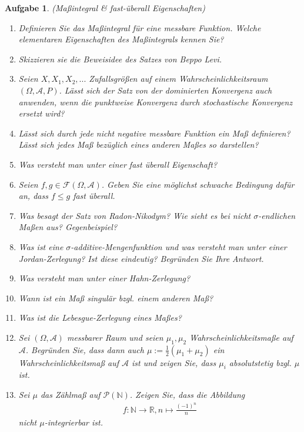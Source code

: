 \documentclass[11pt, a4paper, ngerman]{article}
\newcommand{\N}{\mathbb{N}}
\newcommand{\R}{\mathbb{R}}
\newtheorem{aufgabe}{Aufgabe}
\begin{document}
\begin{aufgabe} (Maßintegral \& fast-überall Eigenschaften)
    \begin{enumerate}
        \item 
        Definieren Sie das Maßintegral für eine messbare Funktion. Welche elementaren Eigenschaften des Maßintegrals kennen Sie?  
        \item
        Skizzieren sie die Beweisidee des Satzes von Beppo Levi. 
        \item 
        Seien $X, X_1, X_2,...$ Zufallsgrößen auf einem Wahrscheinlichkeitsraum $(\Omega, \mathcal{A},P)$. Lässt sich der Satz von der dominierten Konvergenz auch anwenden, wenn die punktweise Konvergenz durch stochastische Konvergenz ersetzt wird? 
        \item 
        Lässt sich durch jede nicht negative messbare Funktion ein Maß definieren? Lässt sich jedes Maß bezüglich eines anderen Maßes so darstellen?
        \item 
        Was versteht man unter einer fast überall Eigenschaft?
        \item 
        Seien $f,g \in \mathcal{F}(\Omega, \mathcal{A})$. Geben Sie eine möglichst schwache Bedingung dafür an, dass $f \leq g$ fast überall.
        \item 
        Was besagt der Satz von Radon-Nikodym? Wie sieht es bei nicht $\sigma$-endlichen Maßen aus? Gegenbeispiel?
        \item 
        Was ist eine $\sigma$-additive-Mengenfunktion und was versteht man unter einer Jordan-Zerlegung? Ist diese eindeutig? Begründen Sie Ihre Antwort. 
        \item 
        Was versteht man unter einer Hahn-Zerlegung?
        \item 
        Wann ist ein Maß singulär bzgl. einem anderen Maß? 
        \item 
        Was ist die Lebesgue-Zerlegung eines Maßes?
        \item 
        Sei $(\Omega, \mathcal{A})$ messbarer Raum und seien $\mu_1, \mu_2$ Wahrscheinlichkeitsmaße auf $\mathcal{A}$. Begründen Sie, dass dann auch $\mu := \frac{1}{2}(\mu_1 + \mu_2)$
        ein Wahrscheinlichkeitsmaß auf $\mathcal{A}$ ist und zeigen Sie, dass $\mu_i$ absolutstetig bzgl. $\mu$ ist. 
        \item 
        Sei $\mu$ das Zählmaß auf $\mathcal{P}(\N)$. Zeigen Sie, dass die Abbildung
        \begin{align*}
            f: \N \to \R, n \mapsto \frac{(-1)^n}{n}
        \end{align*}
        nicht $\mu$-integrierbar ist. 

    
    \end{enumerate}
\end{aufgabe}
\end{document}
